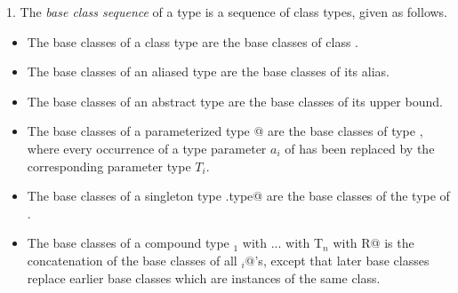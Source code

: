 \documentclass[11pt]{report}
\begin{document}
1. The {\em base class sequence} of a type is a sequence of class types, 
given as follows.
\begin{itemize}
\item
The base classes of a class type \verb@C@ are the base classes of class
\verb@C@.
\item
The base classes of an aliased type are the base classes of its alias.
\item
The base classes of an abstract type are the base classes of its upper bound.
\item
The base classes of a parameterized type \verb@C[T$_1$, ..., T$_n$]@ are the base classes
of type \verb@C@, where every occurrence of a type parameter $a_i$ 
of \verb@C@ has been replaced by the corresponding parameter type $T_i$.
\item
The base classes of a singleton type \verb@p.type@ are the base classes of
the type of \verb@p@.
\item
The base classes of a compound type
\verb@T$_1$ with ... with T$_n$ with {R}@ is the concatenation of the
base classes of all \verb@T$_i$@'s, except that later base classes replace
earlier base classes which are instances of the same class.
\end{itemize}
\end{document}
